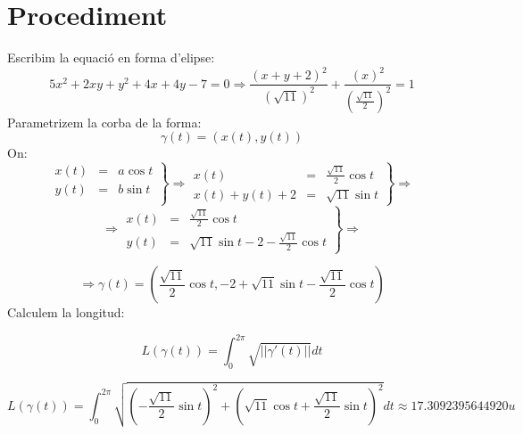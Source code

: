 \documentclass[12pt]{report}
\begin{document}
\section{Procediment}
Escribim la equació en forma d'elipse:
$$5x^2+2xy+y^2+4x+4y-7=0 \Rightarrow \frac{(x+y+2)^2} {(\sqrt{11})^2}+\frac{(x)^2}{(\frac{\sqrt{11}}{2})^2}=1 $$
Parametrizem la corba de la forma:
$$\gamma(t) = (x(t), y(t))$$
On:
$$\left.
\begin{array}{ccc}
     x(t) & = & a\cos{t} \\
     y(t) & = & b\sin{t} \\
\end{array}\right\}
\Longrightarrow
\left.
\begin{array}{ccc}
    x(t) & = & \frac{\sqrt{11}}{2}\cos{t} \\
    x(t) + y(t)+ 2 & = & \sqrt{11}\sin{t} 
\end{array}\right\}
\Longrightarrow$$
$$\Longrightarrow\left.
\begin{array}{ccc}
    x(t) & = & \frac{\sqrt{11}}{2}\cos{t} \\
    y(t) & = &  \sqrt{11}\sin{t} -2 - \frac{\sqrt{11}}{2}\cos{t}
\end{array}\right\} \Longrightarrow$$

$$\Longrightarrow \gamma(t) = \left(\frac{\sqrt{11}}{2}\cos{t},-2+\sqrt{11}\sin{t}-\frac{\sqrt{11}}{2}\cos{t}\right)$$
\newpage
Calculem la longitud:

$$L(\gamma(t)) = \int_{0}^{2\pi} \sqrt{||\gamma'(t)||}dt$$

$$L(\gamma(t)) = \int_{0}^{2\pi} \sqrt{\left(-\frac{\sqrt{11}}{2}\sin{t}\right)^2+\left(\sqrt{11}\cos{t}+\frac{\sqrt{11}}{2}\sin{t}\right)^2} dt \approx 17.3092395644920 u $$
\begin{center}
\end{center}
\end{document}
